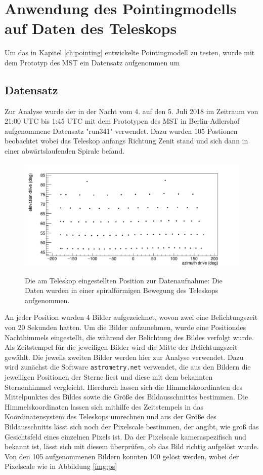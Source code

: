 \chapter{Anwendung des Pointingmodells auf Daten des Teleskops}
\label{ch:auswertung}
Um das in Kapitel \ref{ch:pointing} entwickelte Pointingmodell zu testen, wurde mit dem Prototyp des MST ein Datensatz aufgenommen um
\section{Datensatz}
\label{se:data}
Zur Analyse wurde der in der Nacht vom 4. auf den 5. Juli 2018 im Zeitraum von 21:00 UTC bis 1:45 UTC mit dem Prototypen des MST in Berlin-Adlershof aufgenommene Datensatz "run341" verwendet. Dazu wurden 105 Postionen beobachtet wobei das Teleskop anfangs Richtung Zenit stand und sich dann in einer abwärtslaufenden Spirale befand.
\begin{figure}[htbp]
\centering
\includegraphics[width=\textwidth]{../341/data4.png}
\label{img:record}
\caption{Die am Teleskop eingestellten Position zur Datenaufnahme: Die Daten wurden in einer spiralförmigen Bewegung des Teleskops aufgenommen.}
\end{figure}
An jeder Position wurden 4 Bilder aufgezeichnet, wovon zwei eine Belichtungszeit von 20 Sekunden hatten.
Um die Bilder aufzunehmen, wurde eine Positiondes Nachthimmels eingestellt, die während der Belichtung des Bildes verfolgt wurde. Als Zeitstempel für die jeweiligen Bilder wird die Mitte der Belichtungszeit gewählt. Die jeweils zweiten Bilder werden hier zur Analyse verwendet. Dazu wird zunächst die Software \texttt{astrometry.net} verwendet, die aus den Bildern die jeweiligen Positionen der Sterne liest und diese mit dem bekannten Sternenhimmel vergleicht. Hierdurch lassen sich die Himmelskoordinaten des Mittelpunktes des Bildes sowie die Größe des Bildausschnittes bestimmen.
Die Himmelskoordinaten lassen sich mithilfe des Zeitstempels in das Koordinatensystem des Teleskops umrechnen und aus der Größe des Bildausschnitts lässt sich noch der Pixelscale bestimmen, der angibt, wie groß das Gesichtsfeld eines einzelnen Pixels ist. Da der Pixelscale kameraspezifisch und bekannt ist, lässt sich mit diesem überprüfen, ob das Bild richtig aufgelöst wurde. Von den 105 aufgenommenen Bildern konnten 100 gelöst werden, wobei der Pixelscale wie in Abbildung \ref{img:ps}

